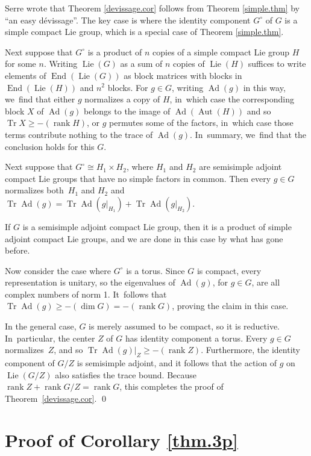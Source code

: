 \documentclass[JEP,XML,SOM,Unicode,NoFloatCountersInSection,published]{cedram}
\theoremstyle{definition}
\let\ic\circ
\DeclareMathOperator{\End}{End}
\DeclareMathOperator{\Tr}{Tr}
\DeclareMathOperator{\Ad}{Ad}
\DeclareMathOperator{\Lie}{Lie}
\DeclareMathOperator{\Aut}{Aut}
\DeclareMathOperator{\rank}{rank}
\begin{document}
Serre wrote that Theorem \ref{devissage.cor} follows from Theorem \ref{simple.thm} by ``an easy dévissage''. The key case is where the identity component $G^\ic$ of $G$ is a simple compact Lie group, which is a special case of Theorem \ref{simple.thm}.

Next suppose that $G^\ic$ is a product of $n$ copies of a simple compact Lie group $H$ for some $n$. Writing $\Lie(G)$ as a sum of $n$ copies of $\Lie(H)$ suffices to write elements of $\End(\Lie(G))$ as block matrices with blocks in $\End(\Lie(H))$ and $n^2$ blocks. For $g \in G$, writing $\Ad(g)$ in this way, we~find that either $g$ normalizes a copy of $H$, in~which case the corresponding block $X$ of $\Ad(g)$ belongs to the image of $\Ad(\Aut(H))$ and so $\Tr X \ge -(\rank H)$, or $g$ permutes some of the factors, in~which case those terms contribute nothing to the trace of $\Ad(g)$. In~summary, we~find that the conclusion holds for this $G$.

Next suppose that $G^\ic \cong H_1 \times H_2$, where $H_1$ and $H_2$ are semisimple adjoint compact Lie groups that have no simple factors in common. Then every $g \in G$ normalizes both~$H_1$ and $H_2$ and $\Tr \Ad(g) = \Tr \Ad(g\vert_{H_1}) + \Tr \Ad(g\vert_{H_2})$.

If $G$ is a semisimple adjoint compact Lie group, then it is a product of simple adjoint compact Lie groups, and we are done in this case by what has gone before.

Now consider the case where $G^\ic$ is a torus. Since $G$ is compact, every representation is unitary, so the eigenvalues of $\Ad(g)$, for $g \in G$, are all complex numbers of norm 1. It~follows that $\Tr \Ad(g) \ge -(\dim G) = -(\rank G)$, proving the claim in this case.

In the general case, $G$ is merely assumed to be compact, so it is reductive. In~particular, the center $Z$ of $G$ has identity component a torus. Every $g \in G$ normalizes~$Z$, and so $\Tr \Ad(g)\vert_Z \ge -(\rank Z)$. Furthermore, the identity component of $G/Z$ is semisimple adjoint, and it follows that the action of $g$ on $\Lie(G/Z)$ also satisfies the trace bound. Because $\rank Z + \rank G/Z = \rank G$, this completes the proof of Theorem~\ref{devissage.cor}. \qed

\section{Proof of Corollary \ref{thm.3p}} \label{finite.proof}
\end{document}
